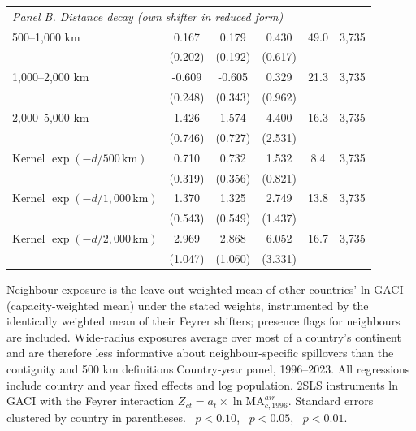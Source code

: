 \begin{table}[p]
\begin{minipage}{\linewidth}
{\begin{tabular}{lccccc}
\multicolumn{6}{l}{\emph{Panel B. Distance decay (own shifter in reduced form)}}\\
500--1{,}000 km & 0.167 & 0.179 & 0.430 & 49.0 & 3{,}735 \\
 & (0.202) & (0.192) & (0.617) \\
1{,}000--2{,}000 km & -0.609\sym{**} & -0.605\sym{*} & 0.329 & 21.3 & 3{,}735 \\
 & (0.248) & (0.343) & (0.962) \\
2{,}000--5{,}000 km & 1.426\sym{*} & 1.574\sym{**} & 4.400\sym{*} & 16.3 & 3{,}735 \\
 & (0.746) & (0.727) & (2.531) \\
Kernel $\exp(-d/500\,\mathrm{km})$ & 0.710\sym{**} & 0.732\sym{**} & 1.532\sym{*} & 8.4 & 3{,}735 \\
 & (0.319) & (0.356) & (0.821) \\
Kernel $\exp(-d/1{,}000\,\mathrm{km})$ & 1.370\sym{**} & 1.325\sym{**} & 2.749\sym{*} & 13.8 & 3{,}735 \\
 & (0.543) & (0.549) & (1.437) \\
Kernel $\exp(-d/2{,}000\,\mathrm{km})$ & 2.969\sym{***} & 2.868\sym{***} & 6.052\sym{*} & 16.7 & 3{,}735 \\
 & (1.047) & (1.060) & (3.331) \\
\bottomrule
\end{tabular}}
\par\vspace{3pt}\begin{flushleft}\footnotesize Neighbour exposure is the leave-out weighted mean of other countries' ln GACI (capacity-weighted mean) under the stated weights, instrumented by the identically weighted mean of their Feyrer shifters; presence flags for neighbours are included. Wide-radius exposures average over most of a country's continent and are therefore less informative about neighbour-specific spillovers than the contiguity and 500 km definitions.Country-year panel, 1996--2023. All regressions include country and year fixed effects and log population. 2SLS instruments ln GACI with the Feyrer interaction $Z_{ct}=a_t\times\ln \mathrm{MA}^{air}_{c,1996}$. Standard errors clustered by country in parentheses. \sym{*}~$p<0.10$, \sym{**}~$p<0.05$, \sym{***}~$p<0.01$.\end{flushleft}
\end{minipage}
\end{table}
